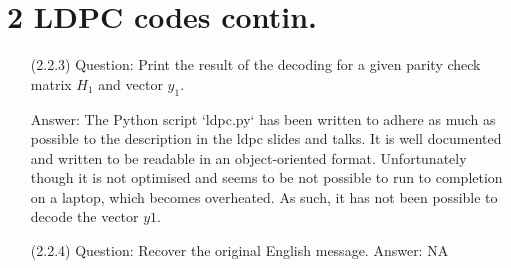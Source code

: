 \documentclass[a4paper,12pt]{article}
\begin{document}
\section*{2 LDPC codes contin.}
\begin{enumerate}
\item[(2.2.3)] Question: Print the result of the decoding for a given parity check matrix $H_1$ and vector $y_1$.

Answer: The Python script `ldpc.py` has been written to adhere as much as possible to the description in the ldpc slides and talks. It is well documented and written to be readable in an object-oriented format. Unfortunately though it is not optimised and seems to be not possible to run to completion on a laptop, which becomes overheated. As such, it has not been possible to decode the vector $y1$.
\item[(2.2.4)] Question: Recover the original English message.
Answer: NA
\end{enumerate}

\clearpage
\end{document}
